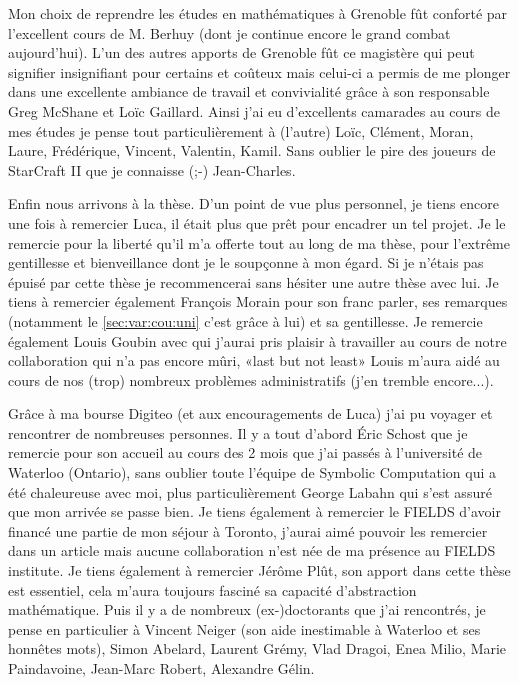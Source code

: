 \documentclass[10pt,a4paper]{book}
\theoremstyle{plain}
\theoremstyle{definition}
\theoremstyle{definition}
\theoremstyle{definition}
\theoremstyle{definition}
\theoremstyle{definition}
\theoremstyle{remark}
\theoremstyle{remark}
\theoremstyle{definition}
\begin{document}
Mon choix de reprendre les études en mathématiques à Grenoble fût conforté par
l'excellent cours de M. Berhuy (dont je continue encore le grand combat 
aujourd'hui). L'un des autres apports de Grenoble fût ce magistère qui peut 
signifier insignifiant pour certains et coûteux mais celui-ci a permis de me 
plonger dans une excellente ambiance de travail et convivialité grâce à son
responsable Greg McShane et Loïc Gaillard. Ainsi j'ai eu d'excellents camarades
au cours de mes études je pense tout particulièrement à (l'autre) Loïc, Clément,
Moran, Laure, Frédérique, Vincent, Valentin, Kamil. Sans oublier le pire des joueurs de 
StarCraft II que je connaisse (;-) Jean-Charles.

Enfin nous arrivons à la thèse. D'un point de vue plus personnel, je tiens 
encore une fois à remercier Luca, il était plus que prêt pour encadrer un tel 
projet. Je le remercie pour la liberté qu'il m'a offerte tout au long de ma 
thèse, pour l'extrême gentillesse et bienveillance dont je le soupçonne à mon 
égard. Si je n'étais pas épuisé par cette thèse je recommencerai sans hésiter 
une autre thèse avec lui. Je tiens à remercier également François Morain pour 
son franc parler, ses remarques (notamment le \ref{sec:var:cou:uni} c'est 
grâce à lui) et sa gentillesse. Je remercie également Louis Goubin avec qui 
j'aurai pris plaisir à travailler au cours de notre collaboration qui n'a pas 
encore mûri, «last but not least» Louis m'aura aidé au cours de nos (trop) 
nombreux problèmes administratifs (j'en tremble encore...). 

Grâce à ma bourse Digiteo (et aux encouragements de Luca) j'ai pu voyager et 
rencontrer de nombreuses personnes. Il y a tout d'abord \'Eric Schost que 
je remercie pour son accueil au cours des 2 mois que j'ai passés à l'université
de Waterloo (Ontario), sans oublier toute l'équipe de Symbolic Computation qui 
a été chaleureuse avec moi, plus particulièrement George Labahn qui s'est 
assuré que mon arrivée se passe bien. Je tiens également à remercier le FIELDS
d'avoir financé une partie de mon séjour à Toronto, j'aurai aimé pouvoir les 
remercier dans un article mais aucune collaboration n'est née de ma présence au
FIELDS institute. Je tiens également à remercier Jérôme Plût, son apport dans
cette thèse est essentiel, cela m'aura toujours fasciné sa capacité 
d'abstraction mathématique. Puis il y a de nombreux (ex-)doctorants 
que j'ai rencontrés, je pense en particulier à Vincent Neiger (son aide 
inestimable à Waterloo et ses honnêtes mots), 
Simon Abelard, Laurent Grémy, Vlad Dragoi, Enea Milio, Marie Paindavoine, 
Jean-Marc Robert, Alexandre Gélin.
\end{document}
